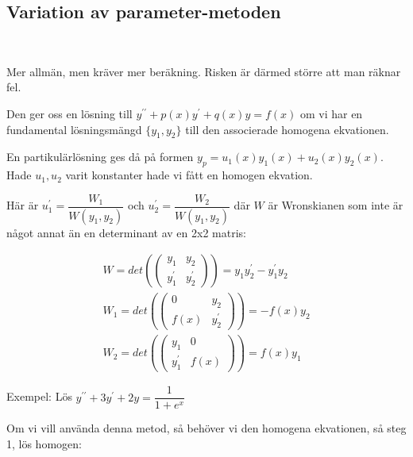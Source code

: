 \subsection{Variation av parameter-metoden}\hfill\\
\par\bigskip

\noindent Mer allmän, men kräver mer beräkning. Risken är därmed större att man räknar fel.
\par\bigskip
\noindent Den ger oss en lösning till $y^{\prime\prime}+p(x)y^{\prime}+q(x)y=f(x)$ om vi har en fundamental lösningsmängd $\{y_1, y_2\}$ till den associerade homogena ekvationen.
\par\bigskip
\noindent En partikulärlösning ges då på formen $y_p = u_1(x)y_1(x)+u_2(x)y_2(x)$. Hade $u_1, u_2$ varit konstanter hade vi fått en homogen ekvation.
\par\bigskip
\noindent Här är $u_1^{\prime} = \dfrac{W_1}{W(y_1, y_2)}$ och $u_2^{\prime} = \dfrac{W_2}{W(y_1, y_2)}$ där $W$ är Wronskianen som inte är något annat än en determinant av en 2x2 matris:


\begin{equation*}
  \begin{gathered}
    W = det\left(\begin{pmatrix}y_1&y_2\\y_1^{\prime}&y_2^{\prime}\end{pmatrix}\right) = y_1y_2^{\prime}-y_1^{\prime}y_2\\
    W_1 = det\left(\begin{pmatrix}0&y_2\\f(x)&y_2^{\prime}
    \end{pmatrix}\right) = -f(x)y_2\\
        W_2 = det\left(\begin{pmatrix}y_1&0\\y_1^{\prime}&f(x)\end{pmatrix}\right) = f(x)y_1
  \end{gathered}
\end{equation*}
\par\bigskip
\noindent Exempel: Lös $y^{\prime\prime}+3y^{\prime}+2y=\dfrac{1}{1+e^x}$
\par\bigskip
\noindent Om vi vill använda denna metod, så behöver vi den homogena ekvationen, så steg 1, lös homogen:


